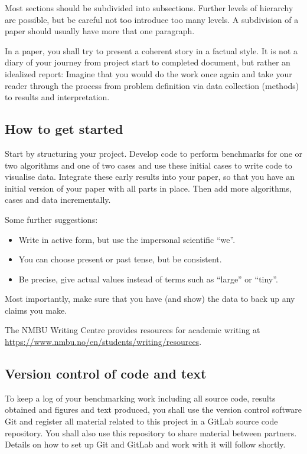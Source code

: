 \documentclass[sigconf, nonacm, natbib, screen, balance=False]{acmart}
\begin{document}
Most sections should be subdivided into subsections. Further levels of
hierarchy are possible, but be careful not too introduce too many
levels. A subdivision of a paper should usually have more that one
paragraph.

In a paper, you shall try to present a coherent story in a factual
style. It is not a diary of your journey from project start to
completed document, but rather an idealized report: Imagine that you
would do the work once again and take your reader through the process
from problem definition via data collection (methods) to results and
interpretation.

\subsection{How to get started}\label{sec:start}

Start by structuring your project. Develop code to perform benchmarks
for one or two algorithms and one of two cases and use these initial
cases to write code to visualise data. Integrate these early results
into your paper, so that you have an initial version of your paper
with all parts in place. Then add more algorithms, cases and data
incrementally.

Some further suggestions:
\begin{itemize}
\item Write in active form, but use the impersonal
  scientific ``we''.
\item You can choose present or past tense, but be consistent.
\item Be precise, give actual values instead of terms such as
  ``large'' or ``tiny''.
\end{itemize}
Most importantly, make sure that you have (and show) the data to back
up any claims you make.

The NMBU Writing Centre provides resources for academic writing at
\url{https://www.nmbu.no/en/students/writing/resources}.


\subsection{Version control of code and text}\label{sec:vc}

To keep a log of your benchmarking work including all source code,
results obtained and figures and text produced, you shall use the
version control software Git and register all material related to this
project in a GitLab source code repository. You shall also use this
repository to share material between partners. Details on how to set
up Git and GitLab and work with it will follow shortly.
\end{document}
